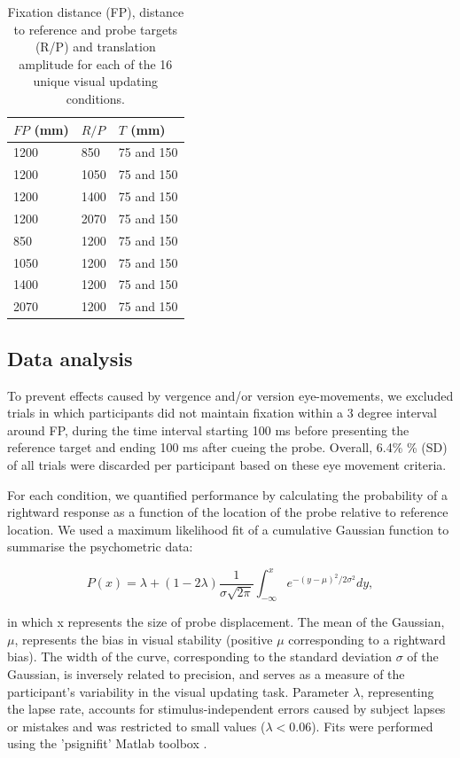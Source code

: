 \begin{table}    
    \begin{tabular}{lll}
    $FP$ (mm) & $R/P$ & $T$ (mm) \\
    \hline
    1200 & 850 & 75 and 150 \\
    1200 & 1050 & 75 and 150 \\
    1200 & 1400 & 75 and 150 \\
    1200 & 2070 & 75 and 150 \\
    850 & 1200 & 75 and 150 \\    
    1050 & 1200 & 75 and 150 \\
    1400 & 1200 & 75 and 150 \\
    2070 & 1200 & 75 and 150 \\
    \end{tabular}
    
    \caption{Fixation distance (FP), distance to reference and probe targets (R/P) and translation amplitude for each of the 16 unique visual updating conditions.}
    
    \label{p2:tab1}
\end{table}

\subsection{Data analysis}

To prevent effects caused by vergence and/or version eye-movements, we excluded trials in which participants did not maintain fixation within a 3 degree interval around FP, during the time interval starting 100 \si{\milli\second} before presenting the reference target and ending 100 \si{\milli\second} after cueing the probe. Overall, 6.4\% \% ({\textpm}SD) of all trials were discarded per participant based on these eye movement criteria. 

For each condition, we quantified performance by calculating the probability of a rightward response as a function of the location of the probe relative to reference location. We used a maximum likelihood fit of a cumulative Gaussian function to summarise the psychometric data:

\begin{equation}
\label{p2:eq1}
P(x) = \lambda + (1 - 2\lambda) \frac{1}{\sigma \sqrt{2\pi}} \int_{-\infty}^{x}{e^{-(y-\mu)^2 / 2\sigma^2}}dy,
\end{equation}

in which x represents the size of probe displacement. The mean of the Gaussian, $\mu$, represents the bias in visual stability (positive $\mu$ corresponding to a rightward bias). The width of the curve, corresponding to the standard deviation $\sigma$ of the Gaussian, is inversely related to precision, and serves as a measure of the participant's variability in the visual updating task. Parameter $\lambda$, representing the lapse rate, accounts for stimulus-independent errors caused by subject lapses or mistakes and was restricted to small values ($\lambda < 0.06$). Fits were performed using the 'psignifit' Matlab toolbox \cite{wichmann2001, wichmann2001b}.


